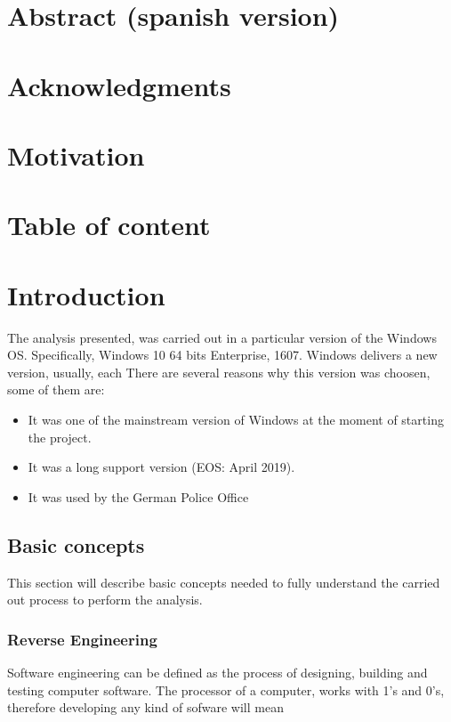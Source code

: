 \documentclass[11pt,a4paper,twoside]{tesis}
\begin{document}
\section*{Abstract (spanish version)}
\section*{Acknowledgments}
\section*{Motivation}
\section*{Table of content}
\section*{Introduction}


The analysis presented, was carried out in a particular version of the Windows OS. Specifically, Windows 10 64 bits Enterprise, 1607. Windows delivers a new version, usually, each 
 There are several reasons why this version was choosen, some of them are: 
\begin{itemize}
    \item It was one of the mainstream version of Windows at the moment of starting the project.
    \item It was a long support version (EOS: April 2019).
    \item It was used by the German Police Office
\end{itemize}

\subsection*{Basic concepts}
This section will describe basic concepts needed to fully understand the carried out process to perform the analysis. 
\subsubsection*{Reverse Engineering}
Software engineering can be defined as the process of designing, building and testing computer software. The processor of a computer, works with 1's and 0's, therefore developing any kind of sofware will mean 
\end{document}
